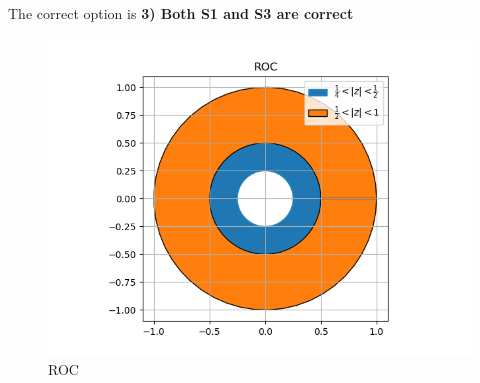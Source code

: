\documentclass[journal,12pt,twocolumn]{IEEEtran}
\begin{document}
The correct option is \textbf{3) Both S1 and S3 are correct}
\begin{figure}[!ht]
\centering
 \includegraphics[width=\columnwidth]{Graphs/ROC.png}
 \caption{ROC}
 \end{figure}
 
\end{document}
